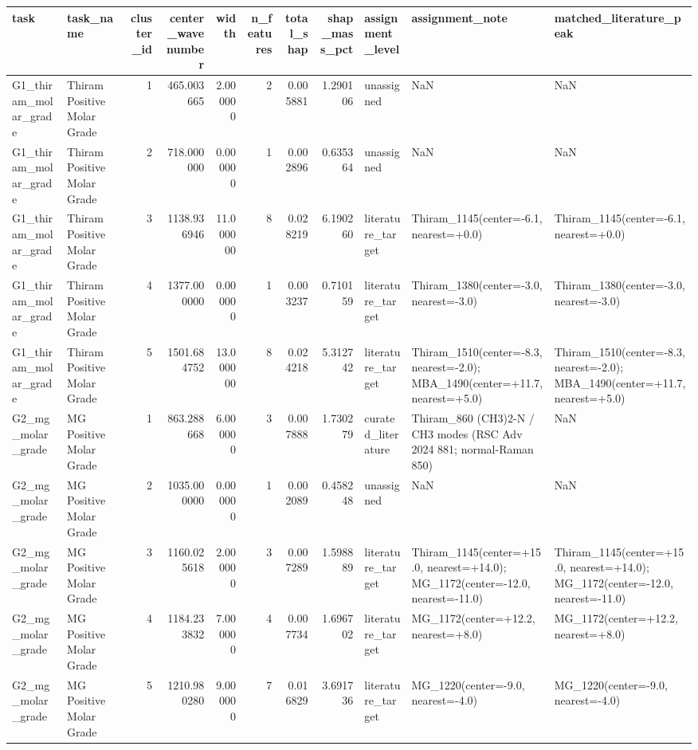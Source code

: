 \begin{tabular}{llrrrrrrlll}
\toprule
task & task_name & cluster_id & center_wavenumber & width & n_features & total_shap & shap_mass_pct & assignment_level & assignment_note & matched_literature_peak \\
\midrule
G1_thiram_molar_grade & Thiram Positive Molar Grade & 1 & 465.003665 & 2.000000 & 2 & 0.005881 & 1.290106 & unassigned & NaN & NaN \\
G1_thiram_molar_grade & Thiram Positive Molar Grade & 2 & 718.000000 & 0.000000 & 1 & 0.002896 & 0.635364 & unassigned & NaN & NaN \\
G1_thiram_molar_grade & Thiram Positive Molar Grade & 3 & 1138.936946 & 11.000000 & 8 & 0.028219 & 6.190260 & literature_target & Thiram_1145(center=-6.1, nearest=+0.0) & Thiram_1145(center=-6.1, nearest=+0.0) \\
G1_thiram_molar_grade & Thiram Positive Molar Grade & 4 & 1377.000000 & 0.000000 & 1 & 0.003237 & 0.710159 & literature_target & Thiram_1380(center=-3.0, nearest=-3.0) & Thiram_1380(center=-3.0, nearest=-3.0) \\
G1_thiram_molar_grade & Thiram Positive Molar Grade & 5 & 1501.684752 & 13.000000 & 8 & 0.024218 & 5.312742 & literature_target & Thiram_1510(center=-8.3, nearest=-2.0); MBA_1490(center=+11.7, nearest=+5.0) & Thiram_1510(center=-8.3, nearest=-2.0); MBA_1490(center=+11.7, nearest=+5.0) \\
G2_mg_molar_grade & MG Positive Molar Grade & 1 & 863.288668 & 6.000000 & 3 & 0.007888 & 1.730279 & curated_literature & Thiram_860 (CH3)2-N / CH3 modes (RSC Adv 2024 881; normal-Raman 850) & NaN \\
G2_mg_molar_grade & MG Positive Molar Grade & 2 & 1035.000000 & 0.000000 & 1 & 0.002089 & 0.458248 & unassigned & NaN & NaN \\
G2_mg_molar_grade & MG Positive Molar Grade & 3 & 1160.025618 & 2.000000 & 3 & 0.007289 & 1.598889 & literature_target & Thiram_1145(center=+15.0, nearest=+14.0); MG_1172(center=-12.0, nearest=-11.0) & Thiram_1145(center=+15.0, nearest=+14.0); MG_1172(center=-12.0, nearest=-11.0) \\
G2_mg_molar_grade & MG Positive Molar Grade & 4 & 1184.233832 & 7.000000 & 4 & 0.007734 & 1.696702 & literature_target & MG_1172(center=+12.2, nearest=+8.0) & MG_1172(center=+12.2, nearest=+8.0) \\
G2_mg_molar_grade & MG Positive Molar Grade & 5 & 1210.980280 & 9.000000 & 7 & 0.016829 & 3.691736 & literature_target & MG_1220(center=-9.0, nearest=-4.0) & MG_1220(center=-9.0, nearest=-4.0) \\

\end{tabular}
